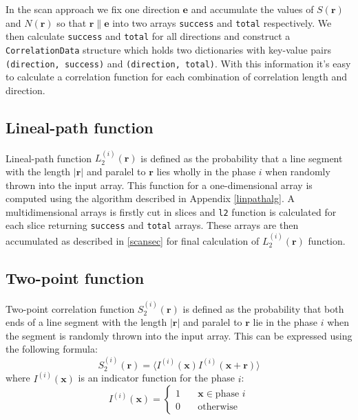 \documentclass[reprint,amsmath,amssymb,aps,pre]{revtex4-1}
\newcommand{\code}[1]{\colorbox{light-gray}{\texttt{#1}}}
\newcommand{\apref}[1]{Appendix \ref{#1}}
\begin{document}
In the scan approach we fix one direction $\bm{e}$ and accumulate the values of
$S(\bm{r})$ and $N(\bm{r})$ so that $\bm{r} \parallel \bm{e}$ into two arrays
\code{success} and \code{total} respectively. We then calculate \code{success}
and \code{total} for all directions and construct a \code{CorrelationData}
structure which holds two dictionaries with key-value pairs
\code{(direction, success)} and \code{(direction, total)}. With this information
it's easy to calculate a correlation function for each combination of
correlation length and direction.

\subsection{Lineal-path function}
Lineal-path function $L_2^{(i)}(\bm{r})$ is defined as the probability that a
line segment with the length $|\bm{r}|$ and paralel to $\bm{r}$ lies wholly in
the phase $i$ when randomly thrown into the input array. This function for a
one-dimensional array is computed using the algorithm described in
\apref{linpathalg}. A multidimensional arrays is firstly cut in slices and
\code{l2} function is calculated for each slice returning \code{success} and
\code{total} arrays. These arrays are then accumulated as described in
\cref{scansec} for final calculation of $L_2^{(i)}(\bm{r})$ function.

\subsection{Two-point function}
\label{sec:s2}
Two-point correlation function $S_2^{(i)}(\bm{r})$ is defined as the probability
that both ends of a line segment with the length $|\bm{r}|$ and paralel to
$\bm{r}$ lie in the phase $i$ when the segment is randomly thrown into the input
array. This can be expressed using the following formula:
\begin{equation*}
  S_2^{(i)}(\bm{r}) = \langle I^{(i)}(\bm{x}) I^{(i)}(\bm{x} + \bm{r}) \rangle
\end{equation*}
where $I^{(i)}(\bm{x})$ is an indicator function for the phase $i$:
\begin{equation*}
I^{(i)}(\bm{x}) = \left\{
\begin{array}{ll}
  1 & \quad \bm{x} \in \text{phase $i$} \\
  0 & \quad \text{otherwise}
\end{array}
\right.
\end{equation*}
\end{document}
